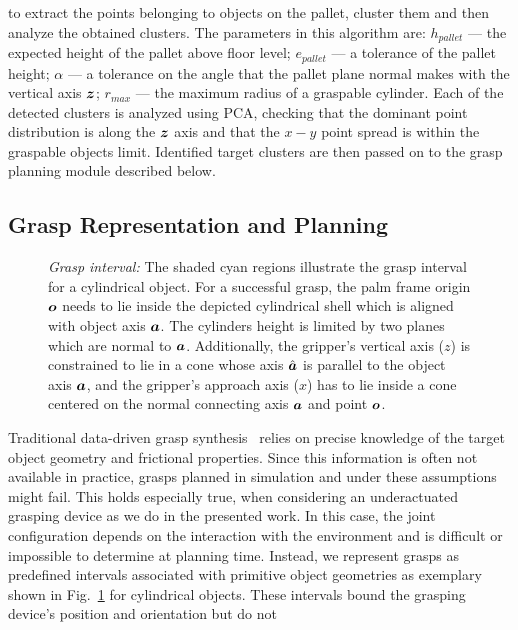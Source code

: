 to extract the points belonging to objects on the pallet, cluster them and then analyze the obtained
clusters. The parameters in this algorithm are: $h_{pallet}$ --- the expected height of the pallet
above floor level; $e_{pallet}$ --- a tolerance of the pallet height; $\alpha$ --- a tolerance on
the angle that the pallet plane normal makes with the vertical axis $\mbox{\boldmath $z$}$; $r_{max}$ --- the
maximum radius of a graspable cylinder. Each of the detected clusters is analyzed using PCA,
checking that the dominant point distribution is along the $\mbox{\boldmath $z$}$ axis and that the $x-y$ point
spread is within the graspable objects limit. Identified target clusters are then passed on to the
grasp planning module described below.
%
\subsection{Grasp Representation and Planning}
\label{subsec:grasp_planning}
%
\begin{figure}[t!] 
   \centering
     
    \caption{\textit{Grasp interval:} The shaded cyan regions illustrate the grasp interval for a
      cylindrical object. For a successful grasp, the palm frame origin $\mbox{\boldmath $o$}$ needs to lie
      inside the depicted cylindrical shell which is aligned with object axis $\mbox{\boldmath $a$}$. The
      cylinders height is limited by two planes which are normal to $\mbox{\boldmath $a$}$. Additionally, the
      gripper's vertical axis ($z$) is constrained to lie in a cone whose axis $\hat{\mbox{\boldmath $a$}}$ is
      parallel to the object axis $\mbox{\boldmath $a$}$, and the gripper's approach axis ($x$) has to lie inside
      a cone centered on the normal connecting axis $\mbox{\boldmath $a$}$ and point $\mbox{\boldmath $o$}$.}
   \label{fig:grasp_interval}
   \vspace{-0.5cm}
\end{figure}
%
Traditional data-driven grasp synthesis~\cite{Bohg14} relies on precise knowledge of the target
object geometry and frictional properties. Since this information is often not available in
practice, grasps planned in simulation and under these assumptions might fail. This holds especially
true, when considering an underactuated grasping device as we do in the presented work. In this
case, the joint configuration depends on the interaction with the environment and is difficult or
impossible to determine at planning time. Instead, we represent grasps as predefined intervals
associated with primitive object geometries as exemplary shown in Fig.~\ref{fig:grasp_interval} for
cylindrical objects. These intervals bound the grasping device's position and orientation but do not
